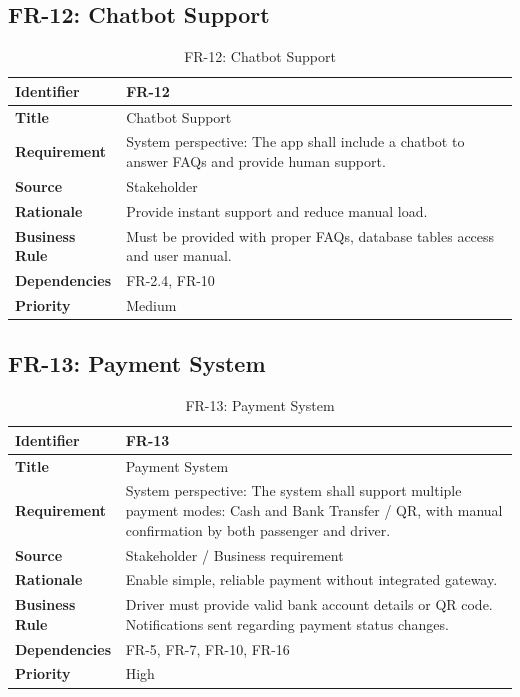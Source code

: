 \subsection{FR-12: Chatbot Support}

\begin{longtable}{|p{3cm}|p{12cm}|}
\caption{FR-12: Chatbot Support}
\label{tab:fr-12} \\
\hline
\rowcolor{lightgray!30}
\textbf{Identifier} & FR-12 \\
\hline
\textbf{Title} & Chatbot Support \\
\hline
\textbf{Requirement} & System perspective: The app shall include a chatbot to answer FAQs and provide human support. \\
\hline
\textbf{Source} & Stakeholder \\
\hline
\textbf{Rationale} & Provide instant support and reduce manual load. \\
\hline
\textbf{Business Rule} & Must be provided with proper FAQs, database tables access and user manual. \\
\hline
\textbf{Dependencies} & FR-2.4, FR-10 \\
\hline
\textbf{Priority} & Medium \\
\hline
\end{longtable}

\subsection{FR-13: Payment System}

\begin{longtable}{|p{3cm}|p{12cm}|}
\caption{FR-13: Payment System}
\label{tab:fr-13} \\
\hline
\rowcolor{lightgray!30}
\textbf{Identifier} & FR-13 \\
\hline
\textbf{Title} & Payment System \\
\hline
\textbf{Requirement} & System perspective: The system shall support multiple payment modes: Cash and Bank Transfer / QR, with manual confirmation by both passenger and driver. \\
\hline
\textbf{Source} & Stakeholder / Business requirement \\
\hline
\textbf{Rationale} & Enable simple, reliable payment without integrated gateway. \\
\hline
\textbf{Business Rule} & Driver must provide valid bank account details or QR code. Notifications sent regarding payment status changes. \\
\hline
\textbf{Dependencies} & FR-5, FR-7, FR-10, FR-16 \\
\hline
\textbf{Priority} & High \\
\hline
\end{longtable}


